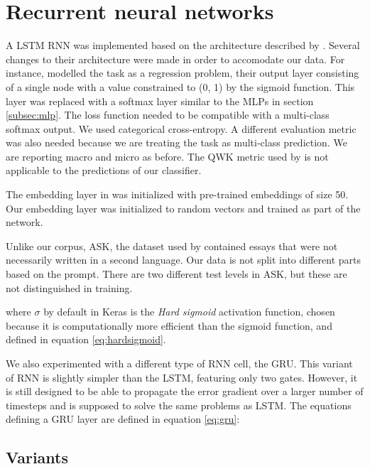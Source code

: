 \section{Recurrent neural networks}

A \ac{LSTM} \ac{RNN} was implemented based on the architecture described by
\textcite{taghipour16}. Several changes to their architecture were made in
order to accomodate our data. For instance, \citeauthor{taghipour16} modelled
the task as a regression problem, their output layer consisting of a single
node with a value constrained to (0, 1) by the sigmoid function. This layer
was replaced with a softmax layer similar to the \acp{MLP} in section
\ref{subsec:mlp}. The loss function needed to be compatible with a
multi-class softmax output. We used categorical cross-entropy. A different
evaluation metric was also needed because we are treating the task as
multi-class prediction. We are reporting macro and micro \FI as before. The
\ac{QWK} metric used by \citeauthor{taghipour16} is not applicable to the
predictions of our classifier.

The embedding layer in \textcite{taghipour16} was initialized with
pre-trained embeddings of size 50. Our embedding layer was initialized to
random vectors and trained as part of the network.

Unlike our corpus, ASK, the dataset used by \citeauthor{taghipour16}
contained essays that were not necessarily written in a second language. Our
data is not split into different parts based on the prompt. There are two
different test levels in ASK, but these are not distinguished in training.

where $\sigma$ by default in Keras is the \emph{Hard sigmoid} activation
function, chosen because it is computationally more efficient than the
sigmoid function, and defined in equation \ref{eq:hardsigmoid}.

We also experimented with a different type of \ac{RNN} cell, the \ac{GRU}.
This variant of \ac{RNN} is slightly simpler than the \ac{LSTM}, featuring
only two gates. However, it is still designed to be able to propagate the
error gradient over a larger number of timesteps and is supposed to solve the
same problems as \ac{LSTM}. The equations defining a \ac{GRU} layer are
defined in equation \ref{eq:gru}:



\subsection{Variants}

